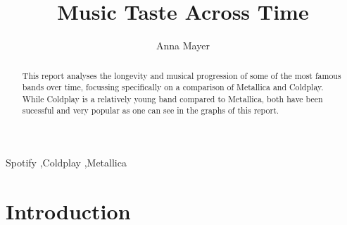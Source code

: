 \documentclass[11pt,preprint, authoryear]{elsarticle}
\numberwithin{equation}{section}
\numberwithin{figure}{section}
\numberwithin{table}{section}
\begin{document}
\begin{frontmatter}  %

\title{Music Taste Across Time}





\author[Add1]{Anna Mayer}





\address[Add1]{Stellenbosch University}


\begin{abstract}
\small{
This report analyses the longevity and musical progression of some of
the most famous bands over time, focussing specifically on a comparison
of Metallica and Coldplay. While Coldplay is a relatively young band
compared to Metallica, both have been sucessful and very popular as one
can see in the graphs of this report.
}
\end{abstract}

\vspace{1cm}


\begin{keyword}
\footnotesize{
Spotify \sep Coldplay \sep Metallica \\
\vspace{0.3cm}
}
\end{keyword}



\vspace{0.5cm}

\end{frontmatter}

\setcounter{footnote}{0}



\pagestyle{fancy}
\chead{}
\rhead{}
\lfoot{}
\lhead{}
\cfoot{}


\headsep 35pt %




\hypertarget{introduction}{%
\section{\texorpdfstring{Introduction
\label{Introduction}}{Introduction }}\label{introduction}}
\end{document}

